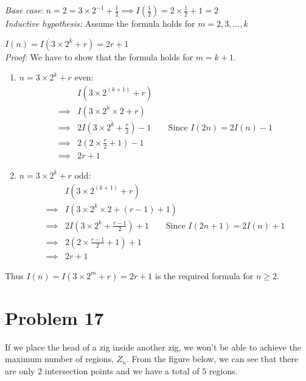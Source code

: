 \textit{Base case}: $n=2=3\times2^{-1} + \frac{1}{2} \implies I(\frac{1}{2})= 2\times \frac{1}{2} + 1 = 2$ \\

\textit{Inductive hypothesis:} Assume the formula holds for $m=2,3,\ldots,k$

$I(n)=I(3\times 2^k + r) = 2r+1$\\

\textit{Proof:} We have to show that the formula holds for $m=k+1$.

\begin{enumerate}[label=(\roman*)]
    \item $n = 3\times2^k + r$ even:
          \begin{align*}
                       & I(3\times 2^{(k+1)} + r)                                             \\
              \implies & I(3\times2^k\times2 + r)                                             \\
              \implies & 2I(3\times2^k + \frac{r}{2}) - 1 \qquad \text{Since $I(2n)=2I(n)-1$} \\
              \implies & 2(2\times\frac{r}{2} + 1) - 1                                        \\
              \implies & 2r + 1
          \end{align*}
    \item $n = 3\times2^k + r$ odd:
          \begin{align*}
                       & I(3\times 2^{(k+1)} + r)                                                 \\
              \implies & I(3\times2^k\times2 + (r-1)+1)                                           \\
              \implies & 2I(3\times2^k + \frac{r-1}{2}) + 1 \qquad \text{Since $I(2n+1)=2I(n)+1$} \\
              \implies & 2(2\times\frac{r-1}{2} + 1) + 1                                          \\
              \implies & 2r + 1
          \end{align*}
\end{enumerate}

Thus $I(n) = I(3\times2^m + r) = 2r + 1$ is the required formula for $n\geq2$.
\clearpage
\section*{Problem 17}
If we place the head of a zig inside another zig, we won't be able to achieve the maximum number of regions, $Z_n$. From the figure below, we can see that there are only $2$ intersection points and we have a total of $5$ regions.


